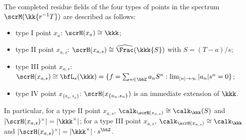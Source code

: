 \begin{proposition}\label{prop:the_complete_residue_field_of_all_four_types_points_in__spectrum_of_Tate_algebra_in_one_variable}
	The completed residue fields of the four types of points in the spectrum \(\scrM(\kk\{r^{-1}T\})\) are described as follows:
	\begin{itemize}
		\item type I point \(x_a\): \(\scrH(x_a) \cong \kkk\);
		\item type II point \(x_{a,s}\): \(\scrH(x_{a,s}) \cong \widehat{\Frac}(\kkk\{S\})\) with \(S = (T - a)/s\);
		\item type III point \(x_{a,s}\): \(\scrH(x_{a,s}) \cong \bfL_{s}(\kkk) = \{f = \sum_{n\in \bbZ} a_n S^n : \lim_{|n| \to \infty} |a_n| s^n = 0\}\);
		\item type IV point \(x_{\{a_n,s_n\}}\): \(\scrH(x_{\{a_n,s_n\}})\) is an immediate extension of \(\kkk\).
	\end{itemize}
	In particular, for a type II point \(x_{a,s}\), \(\calk_{\scrH(x_{a,s})} \cong \calk_\kkk(S)\) and \(|\scrH(x_{a,s})^\times| = |\kkk^\times|\);
	for a type III point \(x_{a,s}\), \(\calk_{\scrH(x_{a,s})} \cong \calk_\kkk\) and \(|\scrH(x_{a,s})^\times| = |\kkk^\times| \cdot s^\bbZ\).
\end{proposition}
